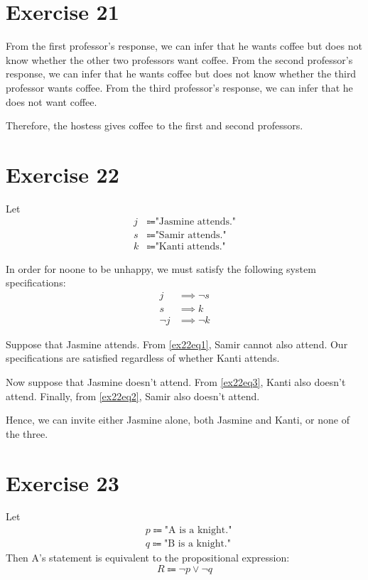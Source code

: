 \documentclass{article}
\begin{document}
\section{Exercise 21}
From the first professor's response, we can infer that he wants coffee but does not know whether the other two professors want coffee.  From the second professor's response, we can infer that he wants coffee but does not know whether the third professor wants coffee. From the third professor's response, we can infer that he does not want coffee.

Therefore, the hostess gives coffee to the first and second professors.

\pagebreak

\section{Exercise 22}
Let
\begin{align*}
	j & \Coloneqq \text{"Jasmine attends."} \\
	s & \Coloneqq \text{"Samir attends."}   \\
	k & \Coloneqq \text{"Kanti attends."}
\end{align*}

In order for noone to be unhappy, we must satisfy the following system specifications:
\begin{align}
	j      & \implies \neg s \label{ex22eq1} \\
	s      & \implies k \label{ex22eq2}      \\
	\neg j & \implies \neg k \label{ex22eq3}
\end{align}

Suppose that Jasmine attends. From \eqref{ex22eq1}, Samir cannot also attend. Our specifications are satisfied regardless of whether Kanti attends.

Now suppose that Jasmine doesn't attend. From \eqref{ex22eq3}, Kanti also doesn't attend. Finally, from \eqref{ex22eq2}, Samir also doesn't attend.

Hence, we can invite either Jasmine alone, both Jasmine and Kanti, or none of the three.

\pagebreak

\section{Exercise 23}
Let
\begin{align*}
	 & p \Coloneqq \text{"A is a knight."} \\
	 & q \Coloneqq \text{"B is a knight."}
\end{align*}
Then A's statement is equivalent to the propositional expression:
\[
	R \Coloneqq \neg p \lor \neg q
\]
\end{document}
